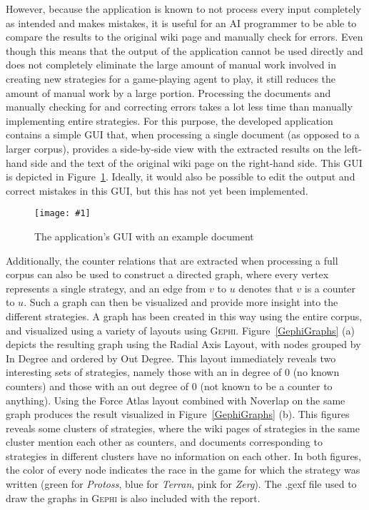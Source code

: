 \documentclass[]{article}
\newcommand{\insertfigurefullsize}[3]{ 
	\begin{figure}[#3]
	\begin{center}
	\texttt{[image: \#1]}
	\caption{#2}
	\label{#1}
	\end{center}
	\end{figure}
}
\newcommand{\reffigure}[1]{Figure~\ref{#1}}
\begin{document}
However, because the application is known to not process every input completely as intended and makes mistakes, it is useful for an AI programmer to be able to compare the results to the original wiki page and manually check for errors. Even though this means that the output of the application cannot be used directly and does not completely eliminate the large amount of manual work involved in creating new strategies for a game-playing agent to play, it still reduces the amount of manual work by a large portion. Processing the documents and manually checking for and correcting errors takes a lot less time than manually implementing entire strategies. For this purpose, the developed application contains a simple GUI that, when processing a single document (as opposed to a larger corpus), provides a side-by-side view with the extracted results on the left-hand side and the text of the original wiki page on the right-hand side. This GUI is depicted in \reffigure{GUI}. Ideally, it would also be possible to edit the output and correct mistakes in this GUI, but this has not yet been implemented.

\insertfigurefullsize{GUI}{The application's GUI with an example document}{h}

Additionally, the counter relations that are extracted when processing a full corpus can also be used to construct a directed graph, where every vertex represents a single strategy, and an edge from $v$ to $u$ denotes that $v$ is a counter to $u$. Such a graph can then be visualized and provide more insight into the different strategies. A graph has been created in this way using the entire corpus, and visualized using a variety of layouts using \textsc{Gephi}. \reffigure{GephiGraphs} (a) depicts the resulting graph using the Radial Axis Layout, with nodes grouped by In Degree and ordered by Out Degree. This layout immediately reveals two interesting sets of strategies, namely those with an in degree of $0$ (no known counters) and those with an out degree of $0$ (not known to be a counter to anything). Using the Force Atlas layout combined with Noverlap on the same graph produces the result visualized in \reffigure{GephiGraphs} (b). This figures reveals some clusters of strategies, where the wiki pages of strategies in the same cluster mention each other as counters, and documents corresponding to strategies in different clusters have no information on each other. In both figures, the color of every node indicates the race in the game for which the strategy was written (green for \emph{Protoss}, blue for \emph{Terran}, pink for \emph{Zerg}). The .gexf file used to draw the graphs in \textsc{Gephi} is also included with the report.
\end{document}
